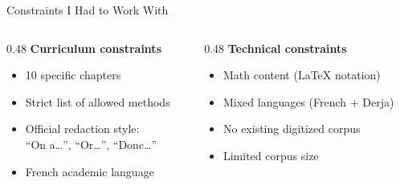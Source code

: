 \documentclass[aspectratio=169, 11pt]{beamer}
\begin{document}
\begin{frame}{Constraints I Had to Work With}

\begin{columns}[T]
\begin{column}{0.48\textwidth}
\textbf{Curriculum constraints}
\begin{itemize}
    \item 10 specific chapters
    \item Strict list of allowed methods
    \item Official redaction style:\\
          ``On a\ldots'', ``Or\ldots'', ``Donc\ldots''
    \item French academic language
\end{itemize}
\end{column}
\begin{column}{0.48\textwidth}
\textbf{Technical constraints}
\begin{itemize}
    \item Math content (LaTeX notation)
    \item Mixed languages (French + Derja)
    \item No existing digitized corpus
    \item Limited corpus size
\end{itemize}
\end{column}
\end{columns}

\end{frame}
\end{document}
